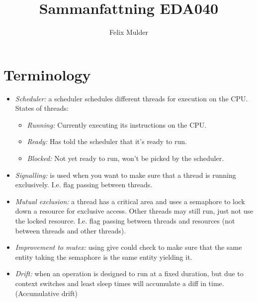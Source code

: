 \documentclass[a4paper]{article}
\title{Sammanfattning EDA040}
\author{Felix Mulder}
\begin{document}
\maketitle
\thispagestyle{empty}
\newpage
\setcounter{page}{1}

\section{Terminology}
\begin{itemize}
  \item \emph{Scheduler:} a scheduler schedules different threads for execution
        on the CPU. States of threads:
        \begin{itemize}
          \item \emph{Running:} Currently executing its instructions on the CPU.
          \item \emph{Ready:} Has told the scheduler that it's ready to run.
          \item \emph{Blocked:} Not yet ready to run, won't be picked by the
                scheduler.
        \end{itemize}
  \item \emph{Signalling:} is used when you want to make sure that a thread is
        running exclusively. I.e. flag passing between threads.
  \item \emph{Mutual exclusion:} a thread has a critical area and uses a semaphore
        to lock down a resource for exclusive access. Other threads may still
        run, just not use the locked resource. I.e. flag passing between threads
        and resources (not between threads and other threads).
  \item \emph{Improvement to mutex:} using give could check to make sure that the
        same entity taking the semaphore is the same entity yielding it.
  \item \emph{Drift:} when an operation is designed to run at a fixed duration,
        but due to context switches and least sleep times will accumulate a diff
        in time. (Accumulative drift)
\end{itemize}
\end{document}
